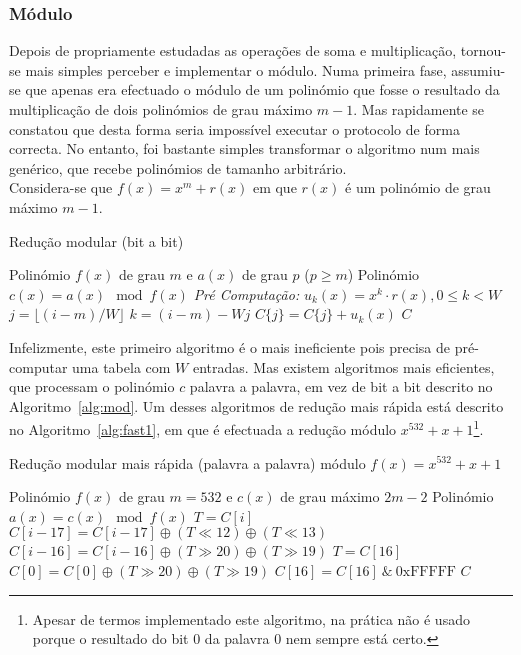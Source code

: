 \subsubsection{Módulo}
Depois de propriamente estudadas as operações de soma e multiplicação, tornou-se mais simples perceber e implementar o módulo. Numa primeira fase, assumiu-se que apenas era efectuado o módulo de um polinómio que fosse o resultado da multiplicação de dois polinómios de grau máximo $m - 1$. Mas rapidamente se constatou que desta forma seria impossível executar o protocolo de forma correcta. No entanto, foi bastante simples transformar o algoritmo num mais genérico, que recebe polinómios de tamanho arbitrário.\\
Considera-se que $f(x) = x^{m} + r(x)$ em que $r(x)$ é um polinómio de grau máximo $m - 1$.\\
\begin{algorithm}[htb!]
  \caption{Redução modular (bit a bit)}\label{alg:mod}
  \begin{algorithmic}
    \Require Polinómio $f(x)$ de grau $m$ e $a(x)$ de grau $p$ ($p \geq m$)
    \Ensure Polinómio $c(x) = a(x) \mod{f(x)}$
    \State \textit{Pré Computação:} $u_k(x) = x^k \cdot r(x), 0 \leq k < W$
      \State $j = \lfloor (i-m) / W \rfloor$
      \State $k = (i - m) - Wj$
      \State $C\{j\} = C\{j\} + u_k(x)$
    \EndIf
    \EndFor
    \State \Return $C$
  \end{algorithmic}
\end{algorithm}
Infelizmente, este primeiro algoritmo é o mais ineficiente pois precisa de pré-computar uma tabela com $W$ entradas. Mas existem algoritmos mais eficientes, que processam o polinómio $c$ palavra a palavra, em vez de bit a bit descrito no Algoritmo~\ref{alg:mod}. Um desses algoritmos de redução mais rápida está descrito no Algoritmo~\ref{alg:fast1}, em que é efectuada a redução módulo $x^{532} + x + 1$\footnote{Apesar de termos implementado este algoritmo, na prática não é usado porque o resultado do bit 0 da palavra 0 nem sempre está certo.}.
\begin{algorithm}[htb!]
  \caption{Redução modular mais rápida (palavra a palavra) módulo $f(x) = x^{532} + x + 1$}\label{alg:fast1}
  \begin{algorithmic}
    \Require Polinómio $f(x)$ de grau $m = 532$ e $c(x)$ de grau máximo $2m - 2$
    \Ensure Polinómio $a(x) = c(x) \mod{f(x)}$
      \State $T = C[i]$
      \State $C[i-17] = C[i-17] \oplus (T \ll 12) \oplus (T \ll 13) $
      \State $C[i-16] = C[i-16] \oplus (T \gg 20) \oplus (T \gg 19) $
    \EndFor
    \State $T = C[16]$
    \State $C[0] = C[0] \oplus (T \gg 20) \oplus (T \gg 19)$
    \State $C[16] = C[16]\ \&\ \text{0xFFFFF}$
    \State \Return $C$
  \end{algorithmic}
\end{algorithm}
